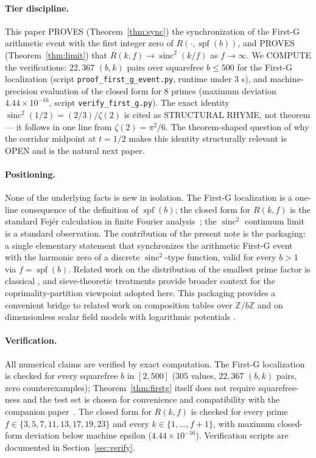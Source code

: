\documentclass[11pt,reqno]{amsart}
\theoremstyle{plain}
\theoremstyle{definition}
\theoremstyle{remark}
\DeclareMathOperator{\spf}{spf}
\DeclareMathOperator{\sinc}{sinc}
\newcommand{\Z}{\mathbb{Z}}
\newcommand{\Zb}{\Z/b\Z}
\begin{document}
\paragraph{Tier discipline.} This paper PROVES (Theorem~\ref{thm:sync})
the synchronization of the First-G arithmetic event with the first
integer zero of $R(\cdot, \spf(b))$, and PROVES
(Theorem~\ref{thm:limit}) that $R(k,f) \to \sinc^{2}(k/f)$ as
$f \to \infty$. We COMPUTE the verifications: $22{,}367$ $(b,k)$ pairs
over squarefree $b \le 500$ for the First-G localization (script
\texttt{proof\_first\_g\_event.py}, runtime under $3$ s), and
machine-precision evaluation of the closed form for $8$ primes
(maximum deviation $4.44 \times 10^{-16}$, script
\texttt{verify\_first\_g.py}). The exact identity
$\sinc^{2}(1/2) = (2/3)/\zeta(2)$ is cited as STRUCTURAL RHYME, not
theorem --- it follows in one line from $\zeta(2) = \pi^{2}/6$. The
theorem-shaped question of why the corridor midpoint at $t = 1/2$
makes this identity structurally relevant is OPEN and is the natural
next paper.

\paragraph{Positioning.} None of the underlying facts is new in
isolation. The First-G localization is a one-line consequence of the
definition of $\spf(b)$; the closed form for $R(k,f)$ is the standard
Fej\'{e}r calculation in finite Fourier analysis~\cite{Zygmund2002,
OppenheimSchafer2010}; the $\sinc^{2}$ continuum limit is a standard
observation. The contribution of the present note is the packaging:
a single elementary statement that synchronizes the arithmetic
First-G event with the harmonic zero of a discrete $\sinc^{2}$-type
function, valid for every $b > 1$ via $f = \spf(b)$. Related work on
the distribution of the smallest prime factor is classical
\cite{Erdos1959,Pomerance1985,Tenenbaum2015}, and sieve-theoretic
treatments \cite{IwaniecKowalski2004,FriedlanderIwaniec2010} provide
broader context for the coprimality-partition viewpoint adopted here.
This packaging provides a convenient bridge to related work on
composition tables over $\Zb$ \cite{SandersGish2026Sigma} and on
dimensionless scalar field models with logarithmic potentials
\cite{SandersGishJohnson2026JCAP}.

\paragraph{Verification.} All numerical claims are verified by exact
computation. The First-G localization is checked for every squarefree
$b$ in $[2,500]$ ($305$ values, $22{,}367$ $(b,k)$ pairs, zero
counterexamples); Theorem~\ref{thm:firstg} itself does not require
squarefree-ness and the test set is chosen for convenience and
compatibility with the companion paper~\cite{SandersGish2026Sigma}.
The closed form for $R(k,f)$ is checked for every prime
$f \in \{3,5,7,11,13,17,19,23\}$ and every $k\in\{1,\dots,f+1\}$,
with maximum closed-form deviation below machine epsilon
($4.44\times 10^{-16}$). Verification scripts are documented in
Section~\ref{sec:verify}.
\end{document}
